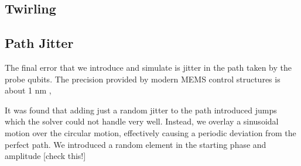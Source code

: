\subsection{Twirling}

\subsection{Path Jitter}
The final error that we introduce and simulate is jitter in the path taken by the probe qubits. The precision provided by modern MEMS control structures is about 1 nm \cite{MEMS precision}, 

It was found that adding just a random jitter to the path introduced jumps which the solver could not handle very well. Instead, we overlay a sinusoidal motion over the circular motion, effectively causing a periodic deviation from the perfect path. We introduced a random element in the starting phase and amplitude [check this!] 


